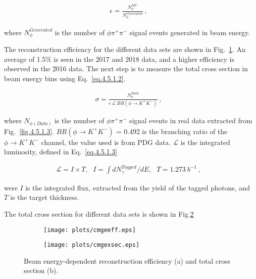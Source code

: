 \begin{equation}
    \label{eq.4.5.1.1}
    \begin{aligned}
        \epsilon=\frac{N_{\phi}^{MC}}{N_{\phi}^{Generated}}~,
    \end{aligned}
\end{equation}

where $N_{\phi}^{Generated}$ is the number of $\phi \pi^+ \pi^-$ signal events generated in beam energy.
\par The reconstruction efficiency for the different data sets are shown in Fig.~\ref{fig.4.5.1.4.a}. An average of 1.5$\%$ is seen in the 2017 and 2018 data, and a higher efficiency is observed in the 2016 data.
The next step is to measure the total cross section in beam energy bins using Eq.~\ref{eq.4.5.1.2}.

\begin{equation}
    \label{eq.4.5.1.2}
    \begin{aligned}
        \sigma = \frac{N_{\phi}^{Data}}{\epsilon~\mathcal{L}~BR(\phi\rightarrow K^{+}K^{-})}~,
    \end{aligned}
\end{equation}

where $N_{\phi(Data)}$ is the number of $\phi \pi^+ \pi^-$ signal events in real data extracted from Fig.~\ref{fig.4.5.1.3}. $BR(\phi\rightarrow K^{+}K^{-})$ = 0.492 is the branching ratio of the $\phi\rightarrow K^{+}K^{-}$ channel, the value used is from PDG data. $\mathcal{L}$ is the integrated luminosity, defined in Eq.~\ref{eq.4.5.1.3}

\begin{equation}
    \label{eq.4.5.1.3}
    \begin{aligned}
        \mathcal{L}=I \times T,~~~ I=\int dN_{\gamma}^{Tagged}/dE,~~~ T = 1.273~b^{-1}~,
    \end{aligned}
\end{equation}

were $I$ is the integrated flux, extracted from the yield of the tagged photons, and $T$ is the target thickness.
\par The total cross section for different data sets is shown in Fig.\ref{fig.4.5.1.4.b}

\begin{figure}[H]
    \centering
    \begin{subfigure}[b]{0.45\textwidth}
        \texttt{[image: plots/cmgeeff.eps]}
        \caption{}
        \label{fig.4.5.1.4.a}
    \end{subfigure}
    \begin{subfigure}[b]{0.45\textwidth}
        \texttt{[image: plots/cmgexsec.eps]}
        \caption{}
        \label{fig.4.5.1.4.b}
    \end{subfigure}
    \caption{Beam energy-dependent reconstruction efficiency (a) and total cross section (b).}
    \label{fig:4.5.1.4}
\end{figure}

